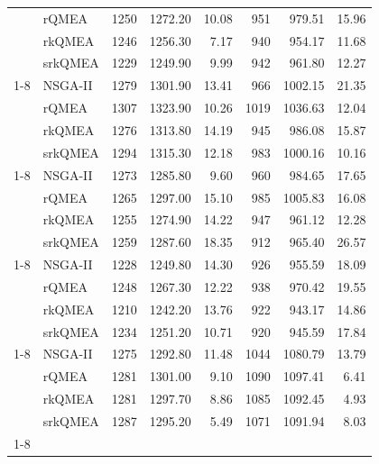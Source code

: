 \begin{tabular}{llrrrrrr}
 & rQMEA & 1250 & 1272.20 & 10.08 & 951 & 979.51 & 15.96 \\
 & rkQMEA & 1246 & 1256.30 & 7.17 & 940 & 954.17 & 11.68 \\
 & srkQMEA & 1229 & 1249.90 & 9.99 & 942 & 961.80 & 12.27 \\
\cline{1-8}
\multirow[t]{4}{*}{la27} & NSGA-II & 1279 & 1301.90 & 13.41 & 966 & 1002.15 & 21.35 \\
 & rQMEA & 1307 & 1323.90 & 10.26 & 1019 & 1036.63 & 12.04 \\
 & rkQMEA & 1276 & 1313.80 & 14.19 & 945 & 986.08 & 15.87 \\
 & srkQMEA & 1294 & 1315.30 & 12.18 & 983 & 1000.16 & 10.16 \\
\cline{1-8}
\multirow[t]{4}{*}{la28} & NSGA-II & 1273 & 1285.80 & 9.60 & 960 & 984.65 & 17.65 \\
 & rQMEA & 1265 & 1297.00 & 15.10 & 985 & 1005.83 & 16.08 \\
 & rkQMEA & 1255 & 1274.90 & 14.22 & 947 & 961.12 & 12.28 \\
 & srkQMEA & 1259 & 1287.60 & 18.35 & 912 & 965.40 & 26.57 \\
\cline{1-8}
\multirow[t]{4}{*}{la29} & NSGA-II & 1228 & 1249.80 & 14.30 & 926 & 955.59 & 18.09 \\
 & rQMEA & 1248 & 1267.30 & 12.22 & 938 & 970.42 & 19.55 \\
 & rkQMEA & 1210 & 1242.20 & 13.76 & 922 & 943.17 & 14.86 \\
 & srkQMEA & 1234 & 1251.20 & 10.71 & 920 & 945.59 & 17.84 \\
\cline{1-8}
\multirow[t]{4}{*}{la40} & NSGA-II & 1275 & 1292.80 & 11.48 & 1044 & 1080.79 & 13.79 \\
 & rQMEA & 1281 & 1301.00 & 9.10 & 1090 & 1097.41 & 6.41 \\
 & rkQMEA & 1281 & 1297.70 & 8.86 & 1085 & 1092.45 & 4.93 \\
 & srkQMEA & 1287 & 1295.20 & 5.49 & 1071 & 1091.94 & 8.03 \\
\cline{1-8}
\bottomrule
\end{tabular}
